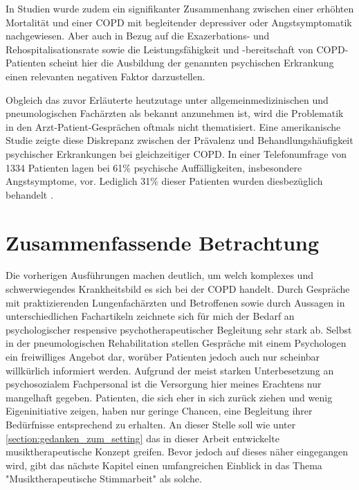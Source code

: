 In Studien wurde zudem ein signifikanter Zusammenhang zwischen einer erhöhten Mortalität und einer COPD mit begleitender depressiver oder Angstsymptomatik nachgewiesen. Aber auch in Bezug auf die Exazerbations- und Rehospitalisationsrate sowie die Leistungsfähigkeit und -bereitschaft von COPD-Patienten scheint hier die Ausbildung der genannten psychischen Erkrankung einen relevanten negativen Faktor darzustellen\autocite[vgl.]{kenn2011}.

Obgleich das zuvor Erläuterte heutzutage unter allgemeinmedizinischen und pneumologischen Fachärzten als bekannt anzunehmen ist, wird die Problematik in den Arzt-Patient-Gesprächen oftmals nicht thematisiert. Eine amerikanische Studie zeigte diese Diskrepanz zwischen der Prävalenz und Behandlungshäufigkeit psychischer Erkrankungen bei gleichzeitiger COPD. In einer Telefonumfrage von 1334 Patienten lagen bei 61\% psychische Auffälligkeiten, insbesondere Angstsymptome, vor. Lediglich 31\% dieser Patienten wurden diesbezüglich behandelt \autocite[vgl.][156]{fischer2007}.


\section{Zusammenfassende Betrachtung}
\label{zusammenfassende betrachtung}
Die vorherigen Ausführungen machen deutlich, um welch komplexes und schwerwiegendes Krankheitsbild es sich bei der COPD handelt. 
Durch Gespräche mit praktizierenden Lungenfachärzten und Betroffenen sowie durch Aussagen in unterschiedlichen Fachartikeln zeichnete sich für mich der Bedarf an psychologischer respensive psychotherapeutischer Begleitung sehr stark ab. Selbst in der pneumologischen Rehabilitation stellen Gespräche mit einem Psychologen ein freiwilliges Angebot dar, worüber Patienten jedoch auch nur scheinbar willkürlich informiert werden. Aufgrund der meist starken Unterbesetzung an psychosozialem Fachpersonal ist die Versorgung hier meines Erachtens nur mangelhaft gegeben. Patienten, die sich eher in sich zurück ziehen und wenig Eigeninitiative zeigen, haben nur geringe Chancen, eine Begleitung ihrer Bedürfnisse entsprechend zu erhalten. An dieser Stelle soll wie unter \ref{section:gedanken_zum_setting} das in dieser Arbeit entwickelte musiktherapeutische Konzept greifen. Bevor jedoch auf dieses näher eingegangen wird, gibt das nächste Kapitel einen umfangreichen Einblick in das Thema "Musiktherapeutische Stimmarbeit" als solche.

\newpage\thispagestyle{empty}